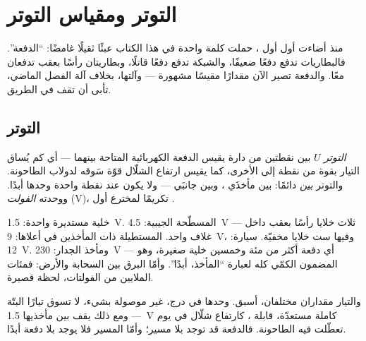 \chapter{التوتر ومقياس التوتر}\label{ch:g8:voltage-voltmeter}

منذ أضاءت أول  أول ، حملت كلمة واحدة في هذا الكتاب
عبئًا ثقيلًا غامضًا: ``الدفعة''. فالبطاريات تدفع دفعًا ضعيفًا،
والشبكة تدفع دفعًا قاتلًا، وبطاريتان رأسًا بعقب تدفعان معًا.
والدفعة تصير الآن مقدارًا مقيسًا  مشهورة --- وآلتها،
بخلاف آلة الفصل الماضي، تأبى أن تقف في الطريق.

\section{التوتر}

\begin{definition}[التوتر]\label{def:g8:voltage-voltmeter:voltage}
\emph{التوتر} $U$ بين نقطتين من دارة يقيس الدفعة
الكهربائية المتاحة بينهما --- أي كم يُساق التيار بقوة من نقطة
إلى الأخرى، كما يقيس ارتفاع الشلّال قوّة سَوقه لدولاب الطاحونة.
والتوتر \emph{بين} دائمًا: بين مأخذَي ، وبين جانبَي
 --- ولا يكون عند نقطة واحدة وحدها أبدًا. ووحدته
\emph{الفولت} (\unit{V})، تكريمًا لمخترع أول
.
\end{definition}

\begin{example}\label{ex:g8:voltage-voltmeter:values}
خلية مستديرة واحدة: \qty{1.5}{V}.  المسطّحة الجيبية:
\qty{4.5}{V} --- ثلاث خلايا رأسًا بعقب داخل غلاف واحد.
 المستطيلة ذات المأخذين في أعلاها: \qty{9}{V}، وفيها
ست خلايا مخفيّة.  سيارة: \qty{12}{V}. ومأخذ الجدار:
\qty{230}{V} --- أي دفعة أكثر من مئة وخمسين خلية صغيرة، وهو
المضمون الكمّي كله لعبارة ``المأخذ، أبدًا''. وأمّا البرق بين
السحابة والأرض: فمئات الملايين من الفولتات، لحظة قصيرة.
\end{example}

\begin{proposition}\label{prop:g8:voltage-voltmeter:nocurrent}
 والتيار مقداران مختلفان،  أسبق.  وحدها في
درج، غير موصولة بشيء، لا تسوق تيارًا البتّة --- ومع ذلك يقف بين
مأخذيها \qty{1.5}{V} كاملة مستعدّة، قابلة ، كارتفاع
شلّال في يوم تعطّلت فيه الطاحونة. فالدفعة قد توجد بلا مسير؛
وأمّا المسير فلا يوجد بلا دفعة أبدًا.
\end{proposition}

